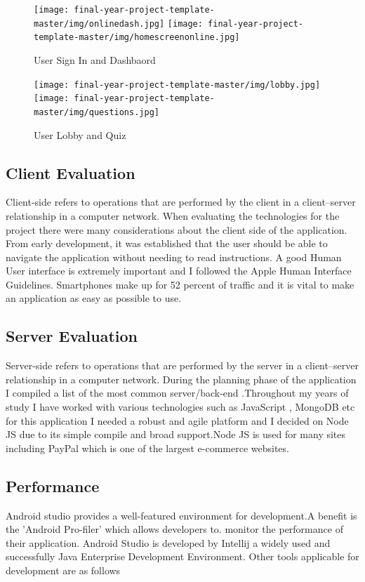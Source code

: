  
 \begin{figure}[H]
  \centering
  \texttt{[image: final-year-project-template-master/img/onlinedash.jpg]}
    \texttt{[image: final-year-project-template-master/img/homescreenonline.jpg]}

     \caption{User Sign In and Dashbaord}
\end{figure}



 \begin{figure}[H]
  \centering
  \texttt{[image: final-year-project-template-master/img/lobby.jpg]}
    \texttt{[image: final-year-project-template-master/img/questions.jpg]}

     \caption{User Lobby and Quiz}
\end{figure}



\subsection{Client Evaluation}
Client-side refers to operations that are performed by the client in a client–server relationship in a computer network.
When evaluating the technologies for the project there were many considerations about the client side of the application. From early development, it was established that the user should be able to navigate the application without needing to read instructions. A good Human User interface is extremely important and I followed the Apple Human Interface Guidelines. Smartphones make up for 52 percent of traffic and it is vital to make an application as easy as possible to use.


\subsection{Server Evaluation}
Server-side refers to operations that are performed by the server in a client–server relationship in a computer network.
During the planning phase of the application I compiled a list of the most common server/back-end .Throughout my years of study I have worked with various  technologies such as JavaScript , MongoDB etc  for this application I needed a robust and agile platform and I decided on Node JS  due to its simple compile  and broad support.Node JS  is used  for many sites including PayPal which is one of the largest e-commerce  websites.
 

\subsection{Performance}
Android studio provides a well-featured environment for development.A  benefit is the 'Android Pro-filer' which allows developers to. monitor the performance of their application. Android Studio is developed by Intellij a widely used and successfully Java Enterprise Development Environment. Other tools applicable for development are as follows


